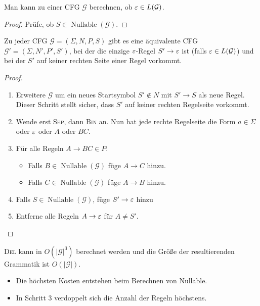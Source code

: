 \begin{Korollar}
  Man kann zu einer \ac{CFG} $\mathcal{G}$ berechnen, ob $\varepsilon \in L(\mathcal{G})$.
\end{Korollar}
\begin{proof}
  Prüfe, ob $S \in \operatorname{Nullable}(\mathcal{G})$.
\end{proof}
\begin{lemma}
  Zu jeder \ac{CFG} $\mathcal{G}=(\Sigma, N, P, S)$ gibt es eine äquivalente \ac{CFG} $\mathcal{G'} =(\Sigma, N', P', S')$, bei der die einzige $\varepsilon$-Regel $S' \to \varepsilon$ ist (falls $\varepsilon \in L(\mathcal{G})$) und bei der $S'$ auf keiner rechten Seite einer Regel vorkommt.
\end{lemma}
\begin{proof}
  \hfill
  \begin{enumerate}
  \item Erweitere $\mathcal{G}$ um ein neues Startsymbol $S' \notin N$ mit $S' \to S$ als neue Regel.
    Dieser Schritt stellt sicher, dass $S'$ auf keiner rechten Regelseite vorkommt.
  \item Wende erst \textsc{Sep}, dann \textsc{Bin} an.
    Nun hat jede rechte Regelseite die Form $a \in \Sigma$ oder $\varepsilon$ oder $A$ oder $BC$.
  \item Für alle Regeln $A \to BC \in P$:
    \begin{itemize}
    \item Falls $B \in \operatorname{Nullable}(\mathcal{G})$ füge $A \to C$ hinzu.
    \item Falls $C \in \operatorname{Nullable}(\mathcal{G})$ füge $A \to B$ hinzu.
    \end{itemize}
  \item Falls $S \in \operatorname{Nullable}(\mathcal{G})$, füge $S' \to \varepsilon$ hinzu
  \item Entferne alle Regeln $A \to \varepsilon$ für $A \neq S'$.
  \qedhere
  \end{enumerate}
\end{proof}
\begin{Bemerkung}
\textsc{Del} kann in $O(|\mathcal{G}|^3)$ berechnet werden und die Größe der resultierenden Grammatik ist $O(|\mathcal{G}|)$.
\begin{itemize}
	\item Die höchsten Kosten entstehen beim Berechnen von Nullable.
	
	\item In Schritt 3 verdoppelt sich die Anzahl der Regeln höchstens.
	\qedhere
\end{itemize}
\end{Bemerkung}

